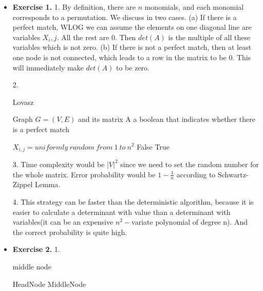 \documentclass{article}
\begin{document}
\noindent

\noindent{}

\begin{itemize}

\item \textbf{Exercise 1.}
1. By definition, there are $n\!$ monomials, and each monomial corresponds to a permutation. We discuss in two cases. (a) If there is a perfect match, WLOG we can assume the elements on one diagonal line are variables $X_i,j$. All the rest are 0. Then $det(A)$ is the multiple of all these variables which is not zero. (b) If there is not a perfect match, then at least one node is not connected, which leads to a row in the matrix to be 0. This will immediately make $det(A)$ to be zero.

2. 
\begin{algorithm}[H]  
    \caption{Lovasz}  
    \begin{algorithmic}[1]  
        \Require Graph $G = (V, E)$ and its matrix A
        \Ensure a boolean that indicates whether there is a perfect match

            \State $X_{i,j} = uniformly\ random\ from\ 1\ to\ n^2$
        \EndFor
            \State \Return False
        \Else
            \State \Return True
        \EndIf
    \end{algorithmic}  
\end{algorithm}

3. Time complexity would be $|V|^2$ since we need to set the random number for the whole matrix. Error probability would be $1-\frac{1}{n}$ according to Schwartz-Zippel Lemma.

4. This strategy can be faster than the deterministic algorithm, because it is easier to calculate a determinant with value than a determinant with variables(it can be an expensive $n^2-$variate polynomial of degree n). And the correct probability is quite high.

\item \textbf{Exercise 2.}
1. 
\begin{algorithm}[H]  
    \caption{middle node}  
    \begin{algorithmic}[1]  
        \Require HeadNode
        \Ensure MiddleNode


\end{algorithmic}
\end{algorithm}
\end{itemize}
\end{document}
